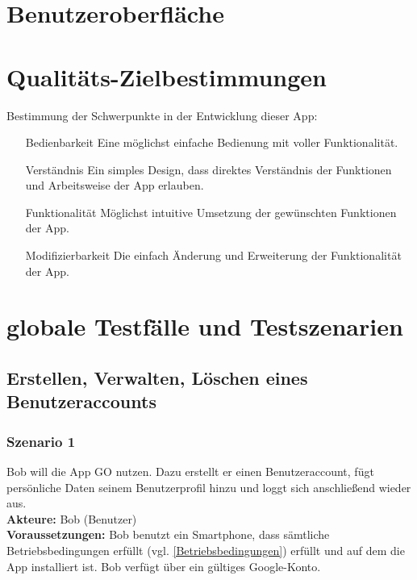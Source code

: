 \documentclass[parskip=full]{scrartcl}
\begin{document}
\newpage
\section{Benutzeroberfläche}

\newpage
\section{Qualitäts-Zielbestimmungen}
Bestimmung der Schwerpunkte in der Entwicklung dieser App:
\begin{enumerate}
	\item[Bedienbarkeit] Eine möglichst einfache Bedienung mit voller Funktionalität.
	\item[Verständnis] Ein simples Design, dass direktes Verständnis der Funktionen und Arbeitsweise der App erlauben.
	\item[Funktionalität] Möglichst intuitive Umsetzung der gewünschten Funktionen der App.
	\item[Modifizierbarkeit] Die einfach Änderung und Erweiterung der Funktionalität der App.
\end{enumerate}

\newpage
\section{globale Testfälle und Testszenarien}

\subsection{Erstellen, Verwalten, Löschen eines Benutzeraccounts}

\subsubsection*{Szenario 1}Bob will die App GO nutzen. Dazu erstellt er einen Benutzeraccount, fügt persönliche Daten seinem Benutzerprofil hinzu und loggt sich anschließend wieder aus.\\

\textbf{Akteure:} Bob (Benutzer) \\

\textbf{Voraussetzungen: }Bob benutzt ein Smartphone, dass sämtliche Betriebsbedingungen erfüllt (vgl. \ref{Betriebsbedingungen}) erfüllt und auf dem die App installiert ist. Bob verfügt über ein gültiges Google-Konto.\\
\end{document}
